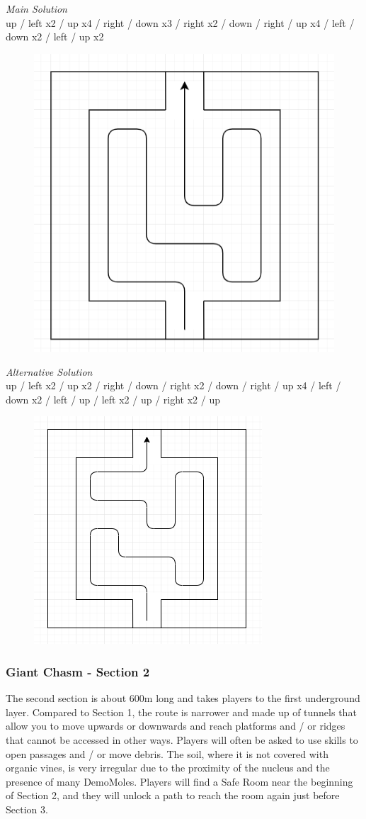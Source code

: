 \textit{Main Solution}\\
up / left x2 / up x4 / right / down x3 / right x2 / down / right / up x4 / left / down x2 / left / up x2\\

\begin{figure}[H]
	\centering
	\includegraphics[width=0.5\linewidth]{images/puzzle/puzzle_011.png}
\end{figure}

\newpage

\textit{Alternative Solution}\\
up / left x2 / up x2 / right / down / right x2 / down / right / up x4 / left / down x2 / left / up / left x2 / up / right x2 / up\\

\begin{figure}[H]
	\centering
	\includegraphics[width=0.5\linewidth]{images/puzzle/puzzle_012.png}
\end{figure}
\newpage


\subsubsection{Giant Chasm - Section 2}
The second section is about 600m long and takes players to the first underground layer.
Compared to Section 1, the route is narrower and made up of tunnels that allow you to move upwards or downwards and reach platforms and / or ridges that cannot be accessed in other ways. Players will often be asked to use skills to open passages and / or move debris. The soil, where it is not covered with organic vines, is very irregular due to the proximity of the nucleus and the presence of many DemoMoles. Players will find a Safe Room near the beginning of Section 2, and they will unlock a path to reach the room again just before Section 3.


